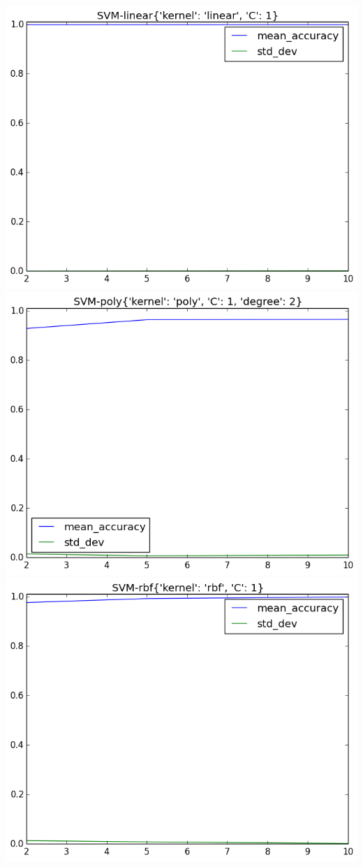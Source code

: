\documentclass[fleqn]{article}
\begin{document}
    \begin{center}
        \includegraphics[scale=0.3]{model_accuracy_vs_folds_SVM-linear.png}
        \includegraphics[scale=0.3]{model_accuracy_vs_folds_SVM-poly.png}
        \includegraphics[scale=0.3]{model_accuracy_vs_folds_SVM-rbf.png}
    \end{center}
\end{document}
